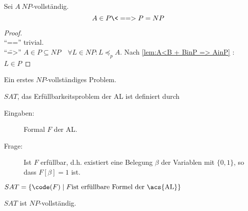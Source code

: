 \begin{Satz}
	Sei $A\ NP$-vollständig.
	\[ A\in P \<==> P=NP \]
\end{Satz}
\begin{proof}\ \\
	"`\<=="' trivial.\\
	"`\==>"' $A\in P\subseteq NP\quad \forall L\in NP: L\preceq_p A$. Nach \autoref{lem:A<B + BinP => AinP} : $L\in P$
\end{proof}
Ein erstes $NP$-vollständiges Problem.
\begin{Def}[name={[$SAT$: Erfüllbarkeitsproblem der \acs*{AL}]}]
	$SAT$, das Erfüllbarkeitsproblem der \acf{AL} ist  definiert durch
	\begin{description}
	\item[Eingaben:] Formal $F$ der \acl{AL}.
	\item[Frage:] Ist $F$ erfüllbar, d.h. existiert eine Belegung $\beta$ der Variablen mit $\{0,1\}$, so dass $F[\beta]=1$ ist.
	\end{description}
	$SAT=\{\code(F) \mid F\text{ist erfüllbare Formel der \acs{AL}}\}$
\end{Def}
\begin{Satz}[Cook]
	$SAT$ ist $NP$-vollständig.
\end{Satz}
